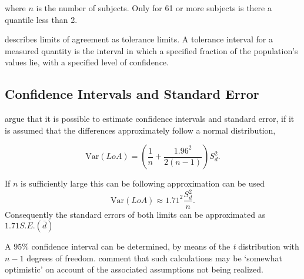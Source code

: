 \documentclass[12pt, a4paper]{article}
\begin{document}
\noindent where $n$ is the number of subjects. Only for 61 or more
subjects is there a quantile less than 2.

\citet{luiz} describes limits of agreement as tolerance limits. A
tolerance interval for a measured quantity is the interval in
which a specified fraction of the population's values lie, with a
specified level of confidence.


\subsection{Confidence Intervals and Standard Error}
\citet*{BA99} argue that it is possible to estimate confidence
intervals and standard error, if it is assumed that the
differences approximately follow a normal distribution,

 \begin{equation}
  \mbox{Var}(LoA) = (\frac{1}{n}+\frac{1.96^{2}}{2(n-1)})S_{d}^{2}.
 \end{equation}

If $n$ is sufficiently large this can be following approximation
can be used
 \begin{equation}
  \mbox{Var}(LoA) \approx 1.71^{2}\frac{S_{d}^{2}}{n}.
 \end{equation}
Consequently the standard errors of both limits can be
approximated as $1.71 S.E.(\bar{d})$

A $95\%$ confidence interval can be determined, by means of the
\emph{t} distribution with $n-1$ degrees of freedom. \citet*{BA99} comment that such calculations  may be `somewhat
optimistic' on account of the associated assumptions not being
realized.


\end{document}
